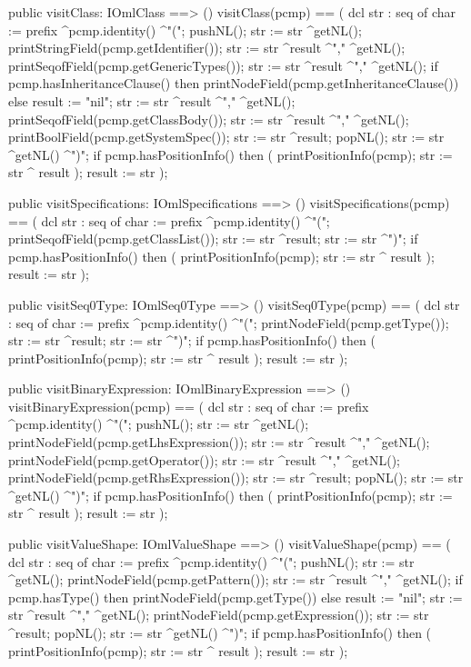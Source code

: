 \begin{vdm_al}
  public visitClass: IOmlClass ==> ()
  visitClass(pcmp) ==
    ( dcl str : seq of char := prefix ^pcmp.identity() ^"(";
      pushNL();
      str := str ^getNL();
      printStringField(pcmp.getIdentifier());
      str := str ^result ^"," ^getNL();
      printSeqofField(pcmp.getGenericTypes());
      str := str ^result ^"," ^getNL();
      if pcmp.hasInheritanceClause()
      then printNodeField(pcmp.getInheritanceClause())
      else result := "nil";
      str := str ^result ^"," ^getNL();
      printSeqofField(pcmp.getClassBody());
      str := str ^result ^"," ^getNL();
      printBoolField(pcmp.getSystemSpec());
      str := str ^result;
      popNL();
      str := str ^getNL() ^")";
      if pcmp.hasPositionInfo()
      then ( printPositionInfo(pcmp);
             str := str ^ result );
      result := str );

  public visitSpecifications: IOmlSpecifications ==> ()
  visitSpecifications(pcmp) ==
    ( dcl str : seq of char := prefix ^pcmp.identity() ^"(";
      printSeqofField(pcmp.getClassList());
      str := str ^result;
      str := str ^")";
      if pcmp.hasPositionInfo()
      then ( printPositionInfo(pcmp);
             str := str ^ result );
      result := str );

  public visitSeq0Type: IOmlSeq0Type ==> ()
  visitSeq0Type(pcmp) ==
    ( dcl str : seq of char := prefix ^pcmp.identity() ^"(";
      printNodeField(pcmp.getType());
      str := str ^result;
      str := str ^")";
      if pcmp.hasPositionInfo()
      then ( printPositionInfo(pcmp);
             str := str ^ result );
      result := str );

  public visitBinaryExpression: IOmlBinaryExpression ==> ()
  visitBinaryExpression(pcmp) ==
    ( dcl str : seq of char := prefix ^pcmp.identity() ^"(";
      pushNL();
      str := str ^getNL();
      printNodeField(pcmp.getLhsExpression());
      str := str ^result ^"," ^getNL();
      printNodeField(pcmp.getOperator());
      str := str ^result ^"," ^getNL();
      printNodeField(pcmp.getRhsExpression());
      str := str ^result;
      popNL();
      str := str ^getNL() ^")";
      if pcmp.hasPositionInfo()
      then ( printPositionInfo(pcmp);
             str := str ^ result );
      result := str );

  public visitValueShape: IOmlValueShape ==> ()
  visitValueShape(pcmp) ==
    ( dcl str : seq of char := prefix ^pcmp.identity() ^"(";
      pushNL();
      str := str ^getNL();
      printNodeField(pcmp.getPattern());
      str := str ^result ^"," ^getNL();
      if pcmp.hasType()
      then printNodeField(pcmp.getType())
      else result := "nil";
      str := str ^result ^"," ^getNL();
      printNodeField(pcmp.getExpression());
      str := str ^result;
      popNL();
      str := str ^getNL() ^")";
      if pcmp.hasPositionInfo()
      then ( printPositionInfo(pcmp);
             str := str ^ result );
      result := str );


\end{vdm_al}
